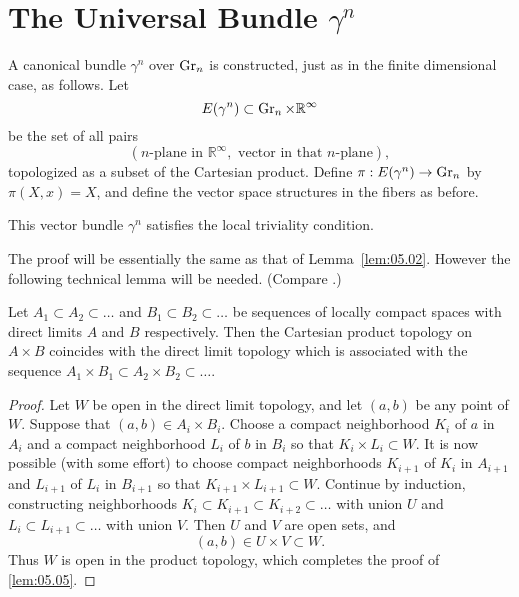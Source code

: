 \documentclass[../main]{subfiles}
\begin{document}
\section{The Universal Bundle \texorpdfstring{$\gamma^n$}{gamma n}}\label{5.2}

A canonical bundle $\gamma^n$ over $\operatorname{Gr}_n$ is constructed, just as in the finite
dimensional case, as follows. Let 
\[
E(\gamma^n)\subset \operatorname{Gr}_n\times {\mathbb R}^\infty
\]
be the set of all pairs
\[
(n\text{-plane in }{\mathbb R}^\infty,\text{ vector in that $n$-plane}),
\]
topologized as a subset of the Cartesian product. Define $\pi: E(\gamma^n) \to \operatorname{Gr}_n$
by $\pi(X, x) = X$, and define the vector space structures in the fibers as
before.

\begin{lemma}\label{lem:05.04}
 This vector bundle $\gamma^n$ satisfies the local triviality
condition.
\end{lemma}
The proof will be essentially the same as that of Lemma~\ref{lem:05.02}. However the
following technical lemma will be needed. (Compare \cite[\S18.5]{whitehead1961}.)
\begin{lemma}\label{lem:05.05} Let $A_1 \subset A_2 \subset \dots$ and $B_1 \subset B_2 \subset \dots$ be sequences
of locally compact spaces with direct limits $A$ and $B$ respectively. Then the Cartesian product topology on $A \times B$ coincides
with the direct limit topology which is associated with the sequence $A_1 \times B_1 \subset A_2 \times B_2 \subset\dots$.
\end{lemma}
\begin{proof} Let $W$ be open in the direct limit topology, and let $(a, b)$ be
any point of $W$. Suppose that $(a, b) \in A_i \times B_i$. Choose a compact neighborhood $K_i$ of $a$ in $A_i$ and a compact neighborhood $L_i$ of $b$ in $B_i$
so that $K_i \times L_i \subset W$. It is now possible (with some effort) to choose compact neighborhoods $K_{i+1}$ of $K_i$ in $A_{i+1}$ and $L_{i+1}$ of $L_i$ in $B_{i+1}$ so
that $K_{i+1} \times L_{i+1}\subset  W$. Continue by induction, constructing neighborhoods
$K_i \subset K_{i+1} \subset K_{i+2} \subset\dots$ with union $U$ and $L_i \subset L_{i+1} \subset \dots$ with union $V$.
Then $U$ and $V$ are open sets, and
\[
(a, b) \in U \times V \subset W.
\]
Thus $W$ is open in the product topology, which completes the proof of \ref{lem:05.05}.
\end{proof}
\end{document}
